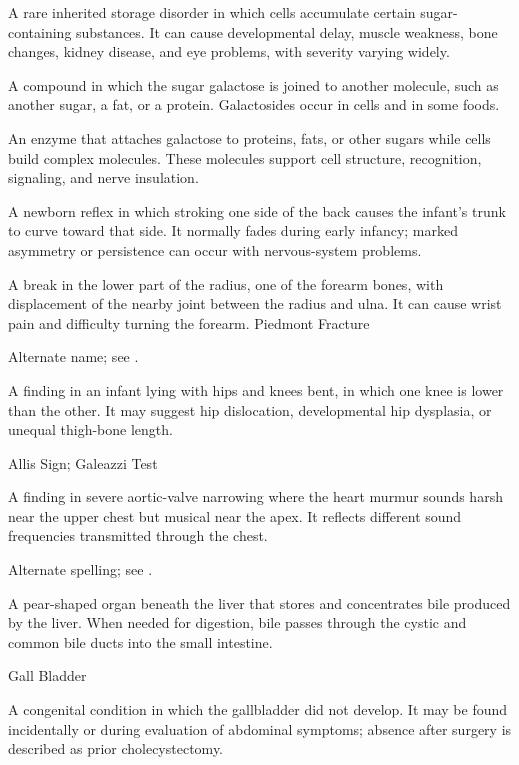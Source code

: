  A rare inherited storage disorder in which cells accumulate certain sugar-containing substances. It can cause developmental delay, muscle weakness, bone changes, kidney disease, and eye problems, with severity varying widely.

 A compound in which the sugar galactose is joined to another molecule, such as another sugar, a fat, or a protein. Galactosides occur in cells and in some foods.

 An enzyme that attaches galactose to proteins, fats, or other sugars while cells build complex molecules. These molecules support cell structure, recognition, signaling, and nerve insulation.

 A newborn reflex in which stroking one side of the back causes the infant’s trunk to curve toward that side. It normally fades during early infancy; marked asymmetry or persistence can occur with nervous-system problems.

 A break in the lower part of the radius, one of the forearm bones, with displacement of the nearby joint between the radius and ulna. It can cause wrist pain and difficulty turning the forearm.
\synonyms
Piedmont Fracture

 Alternate name; see .

 A finding in an infant lying with hips and knees bent, in which one knee is lower than the other. It may suggest hip dislocation, developmental hip dysplasia, or unequal thigh-bone length.

\synonyms
Allis Sign; Galeazzi Test

 A finding in severe aortic-valve narrowing where the heart murmur sounds harsh near the upper chest but musical near the apex. It reflects different sound frequencies transmitted through the chest.

 Alternate spelling; see .

 A pear-shaped organ beneath the liver that stores and concentrates bile produced by the liver. When needed for digestion, bile passes through the cystic and common bile ducts into the small intestine.

\synonyms
Gall Bladder

 A congenital condition in which the gallbladder did not develop. It may be found incidentally or during evaluation of abdominal symptoms; absence after surgery is described as prior cholecystectomy.

